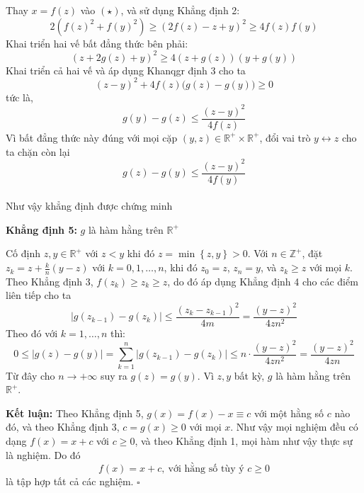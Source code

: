 \documentclass[12pt,a4paper]{article}
\begin{document}
{Thay $x = f(z)$ vào $(\star)$, và sử dụng Khẳng định 2:
$$2\left(f(z)^2+f(y)^2\right) \ge \left(2f(z)-z+y\right)^2 \ge 4f(z)f(y)$$
Khai triển hai vế bất đẳng thức bên phải:
$$\left(z+2g(z)+y\right)^2 \ge 4(z+g(z))(y+g(y))$$
Khai triển cả hai vế và áp dụng Khanqgr định 3 cho ta
$$(z-y)^2 + 4f(z)\big(g(z)-g(y)\big) \ge 0$$
tức là,
$$g(y) - g(z) \le \dfrac{(z-y)^2}{4f(z)}$$
Vì bất đẳng thức này đúng với mọi cặp $(y,z) \in \mathbb{R}^+\times \mathbb{R}^+$, đổi vai trò $y \leftrightarrow z$ cho ta chặn còn lại
$$g(z) - g(y) \le \frac{(z-y)^2}{4f(y)}$$
\\
Như vậy khẳng định được chứng minh

\textbf{\textcolor{myteal}{Khẳng định 5:}} $g$ là hàm hằng trên $\mathbb{R}^+$

Cố định $z,y \in \mathbb{R}^+$ với $z < y$ khi đó $z = \min\left\{z,y\right\} > 0$. Với $n \in \mathbb{Z}^+$, đặt $z_k = z + \frac{k}{n}(y-z)$ với $k = 0,1,\dots,n$, khi đó $z_0 = z$, $z_n = y$, và $z_k \ge z$ với mọi $k$. Theo Khẳng định 3, $f(z_k) \ge z_k \ge z$, do đó áp dụng Khẳng định 4 cho các điểm liên tiếp cho ta
$$\lvert g(z_{k-1}) - g(z_{k}) \rvert \le \frac{(z_{k}-z_{k-1})^2}{4m} = \frac{(y-z)^2}{4zn^2}$$
Theo đó với $k=1,\dots,n$ thì:
$$0\le \lvert g(z)-g(y)\rvert = \sum_{k=1}^{n} \lvert g(z_{k-1})-g(z_{k})\rvert \le n \cdot \frac{(y-z)^2}{4zn^2} = \frac{(y-z)^2}{4zn}$$
Từ đây cho $n \to +\infty$ suy ra $g(z) = g(y)$. Vì $z,y$ bất kỳ, $g$ là hàm hằng trên $\mathbb{R}^+$.

\textbf{\textcolor{myteal}{Kết luận:}} Theo Khẳng định 5, $g(x) = f(x) - x \equiv c$ với một hằng số $c$ nào đó, và theo Khẳng định 3, $c = g(x) \ge 0$ với mọi $x$. Như vậy mọi nghiệm đều có dạng $f(x) = x+c$ với $c \ge 0$, và theo Khẳng định 1, mọi hàm như vậy thực sự là nghiệm. Do đó $$f(x) = x + c, \ \text{với hằng số tùy ý } c \ge 0$$ là tập hợp tất cả các nghiệm.
\hfill $\square$
}
\end{document}
